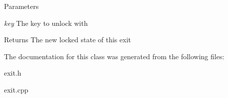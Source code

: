 \begin{DoxyParams}{Parameters}
\item[{\em key}]The key to unlock with \end{DoxyParams}
\begin{DoxyReturn}{Returns}
The new locked state of this exit 
\end{DoxyReturn}


The documentation for this class was generated from the following files:\begin{DoxyCompactItemize}
\item 
exit.h\item 
exit.cpp\end{DoxyCompactItemize}
